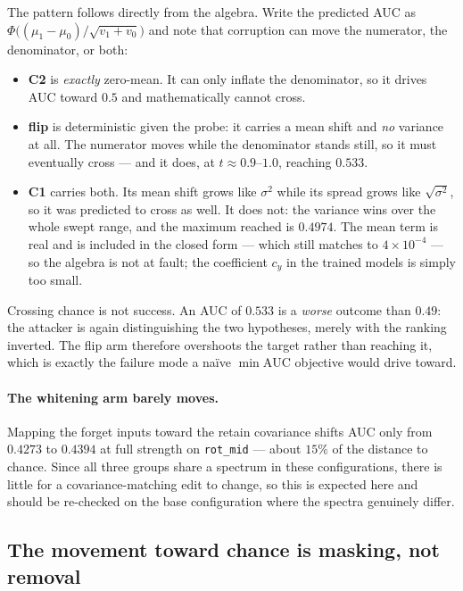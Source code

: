 \documentclass[11pt,a4paper]{article}
\newcommand{\vs}{\sigma^2}
\begin{document}
The pattern follows directly from the algebra. Write the predicted AUC as
$\Phi\!\big((\mu_1-\mu_0)/\sqrt{v_1+v_0}\big)$ and note that corruption can move
the numerator, the denominator, or both:

\begin{itemize}[leftmargin=1.4em,itemsep=1pt]
\item \textbf{C2} is \emph{exactly} zero-mean. It can only inflate the
denominator, so it drives AUC toward $0.5$ and mathematically cannot cross.
\item \textbf{flip} is deterministic given the probe: it carries a mean shift
and \emph{no} variance at all. The numerator moves while the denominator stands
still, so it must eventually cross --- and it does, at $t\approx0.9$--$1.0$,
reaching $0.533$.
\item \textbf{C1} carries both. Its mean shift grows like $\vs$ while its
spread grows like $\sqrt{\vs}$, so it was predicted to cross as well. It does
not: the variance wins over the whole swept range, and the maximum reached is
$0.4974$. The mean term is real and is included in the closed form --- which
still matches to $4\times10^{-4}$ --- so the algebra is not at fault; the
coefficient $c_y$ in the trained models is simply too small.
\end{itemize}

Crossing chance is not success. An AUC of $0.533$ is a \emph{worse} outcome than
$0.49$: the attacker is again distinguishing the two hypotheses, merely with the
ranking inverted. The flip arm therefore overshoots the target rather than
reaching it, which is exactly the failure mode a na\"ive $\min\mathrm{AUC}$
objective would drive toward.

\paragraph{The whitening arm barely moves.} Mapping the forget inputs toward the
retain covariance shifts AUC only from $0.4273$ to $0.4394$ at full strength on
\texttt{rot\_mid} --- about $15\%$ of the distance to chance. Since all
three groups share a spectrum in these configurations, there is little for a
covariance-matching edit to change, so this is expected here and should be
re-checked on the base configuration where the spectra genuinely differ.


\subsection{The movement toward chance is masking, not removal}
\end{document}
